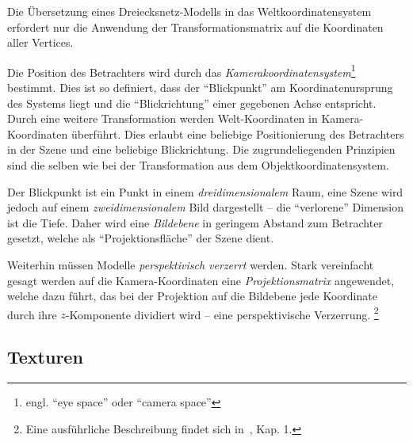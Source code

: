 \documentclass[twoside,a4paper,fleqn,12pt]{book}
\begin{document}
Die Übersetzung eines Dreiecksnetz-Modells in das Weltkoordinatensystem erfordert nur die Anwendung der Transformationsmatrix
auf die Koordinaten aller Vertices.

Die Position des Betrachters wird durch das \emph{Kamerakoordinatensystem}\footnote{engl. ``eye space'' oder ``camera space''}
 bestimmt. Dies ist so definiert, dass der "`Blickpunkt"' am Koordinatenursprung des Systems liegt
und die "`Blickrichtung"' einer gegebenen Achse entspricht. 
Durch eine weitere Transformation werden Welt-Koordinaten in Kamera-Koordinaten
überführt. Dies erlaubt eine beliebige Positionierung des Betrachters in der Szene und eine beliebige Blickrichtung.
Die zugrundeliegenden Prinzipien sind die selben wie bei der Transformation aus dem Objektkoordinatensystem.

Der Blickpunkt ist ein Punkt in einem \emph{dreidimensionalem} Raum, eine Szene wird jedoch auf einem
\emph{zweidimensionalem} Bild dargestellt -- die "`verlorene"' Dimension ist die Tiefe.
Daher wird eine \emph{Bildebene} in geringem Abstand zum Betrachter gesetzt,
welche als "`Projektionsfläche"' der Szene dient.

Weiterhin müssen Modelle \emph{perspektivisch verzerrt} werden. 
Stark vereinfacht gesagt werden auf die Kamera-Koordinaten eine \emph{Projektionsmatrix} angewendet, welche dazu führt,
das bei der Projektion auf die Bildebene jede Koordinate durch ihre $z$-Komponente dividiert wird -- eine perspektivische Verzerrung.
\footnote{Eine ausführliche Beschreibung findet sich in~\cite{watt_de}, Kap. 1.}

\subsection{Texturen}
\end{document}
